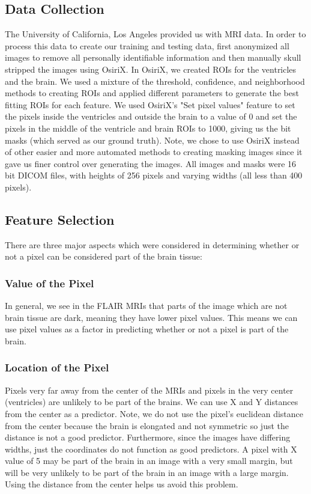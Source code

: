 \documentclass[letterpaper, 10 pt, conference]{ieeeconf}
\begin{document}
\subsection{Data Collection}
The University of California, Los Angeles provided us with MRI data. In order to process this data to create our training and testing data, first anonymized all images to remove all personally identifiable information and then manually skull stripped the images using OsiriX. In OsiriX, we created ROIs for the ventricles and the brain. We used a mixture of the threshold, confidence, and neighborhood methods to creating ROIs and applied different parameters to generate the best fitting ROIs for each feature. We used OsiriX's "Set pixel values" feature to set the pixels inside the ventricles and outside the brain to a value of 0 and set the pixels in the middle of the ventricle and brain ROIs to 1000, giving us the bit masks (which served as our ground truth). Note, we chose to use OsiriX instead of other easier and more automated methods to creating masking images since it gave us finer control over generating the images. All images and masks were 16 bit DICOM files, with heights of 256 pixels and varying widths (all less than 400 pixels).

\subsection{Feature Selection}
There are three major aspects which were considered in determining whether or not a pixel can be considered part of the brain tissue:
\subsubsection{Value of the Pixel}
In general, we see in the FLAIR MRIs that parts of the image which are not brain tissue are dark, meaning they have lower pixel values. This means we can use pixel values as a factor in predicting whether or not a pixel is part of the brain.
\subsubsection{Location of the Pixel}
Pixels very far away from the center of the MRIs and pixels in the very center (ventricles) are unlikely to be part of the brains. We can use X and Y distances from the center as a predictor. Note, we do not use the pixel's euclidean distance from the center because the brain is elongated and not symmetric so just the distance is not a good predictor. Furthermore, since the images have differing widths, just the coordinates do not function as good predictors. A pixel with X value of 5 may be part of the brain in an image with a very small margin, but will be very unlikely to be part of the brain in an image with a large margin. Using the distance from the center helps us avoid this problem.
\end{document}
